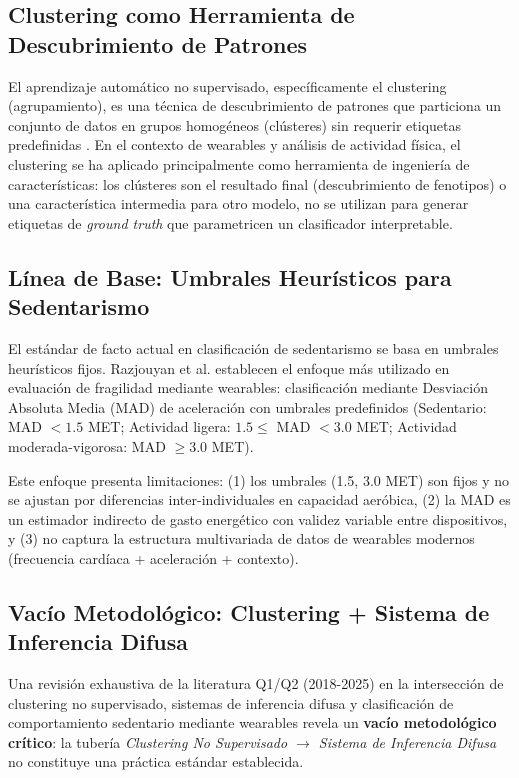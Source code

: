 \subsection{Clustering como Herramienta de Descubrimiento de Patrones}
\label{subsec:clustering_herramienta}

El aprendizaje automático no supervisado, específicamente el clustering (agrupamiento), es una técnica de descubrimiento de patrones que particiona un conjunto de datos en grupos homogéneos (clústeres) sin requerir etiquetas predefinidas \citep{Yoo2012DataMining}. En el contexto de wearables y análisis de actividad física, el clustering se ha aplicado principalmente como herramienta de ingeniería de características: los clústeres son el resultado final (descubrimiento de fenotipos) o una característica intermedia para otro modelo, no se utilizan para generar etiquetas de \textit{ground truth} que parametricen un clasificador interpretable.

\subsection{Línea de Base: Umbrales Heurísticos para Sedentarismo}
\label{subsec:linea_base_umbrales}

El estándar de facto actual en clasificación de sedentarismo se basa en umbrales heurísticos fijos. Razjouyan et al. \citep{Razjouyan2018Frailty} establecen el enfoque más utilizado en evaluación de fragilidad mediante wearables: clasificación mediante Desviación Absoluta Media (MAD) de aceleración con umbrales predefinidos (Sedentario: MAD $< 1.5$ MET; Actividad ligera: $1.5 \leq$ MAD $< 3.0$ MET; Actividad moderada-vigorosa: MAD $\geq 3.0$ MET).

Este enfoque presenta limitaciones: (1) los umbrales (1.5, 3.0 MET) son fijos y no se ajustan por diferencias inter-individuales en capacidad aeróbica, (2) la MAD es un estimador indirecto de gasto energético con validez variable entre dispositivos, y (3) no captura la estructura multivariada de datos de wearables modernos (frecuencia cardíaca + aceleración + contexto).

\subsection{Vacío Metodológico: Clustering + Sistema de Inferencia Difusa}
\label{subsec:vacio_clustering_fuzzy}

Una revisión exhaustiva de la literatura Q1/Q2 (2018-2025) en la intersección de clustering no supervisado, sistemas de inferencia difusa y clasificación de comportamiento sedentario mediante wearables revela un \textbf{vacío metodológico crítico}: la tubería \textit{Clustering No Supervisado $\rightarrow$ Sistema de Inferencia Difusa} no constituye una práctica estándar establecida.

